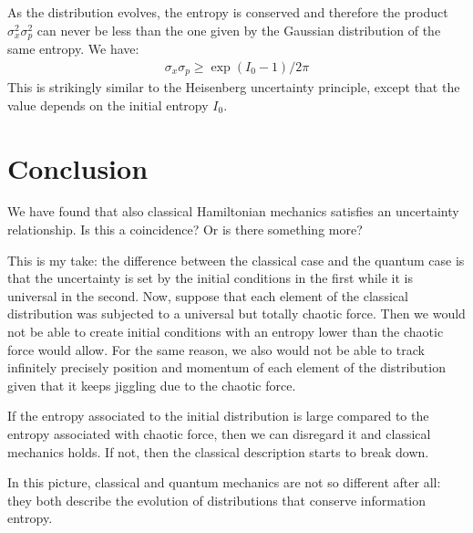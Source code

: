 \documentclass[aps,pra,10pt,floatfix,nofootinbib]{revtex4-1}
\theoremstyle{definition}
\begin{document}
As the distribution evolves, the entropy is conserved and therefore the product $\sigma_x^2 \sigma_p^2$ can never be less than the one given by the Gaussian distribution of the same entropy. We have:
\begin{align*}
\sigma_x\sigma_p \geq \exp (I_0 - 1) / 2 \pi 
\end{align*}
This is strikingly similar to the Heisenberg uncertainty principle, except that the value depends on the initial entropy $I_0$.

\section{Conclusion}

We have found that also classical Hamiltonian mechanics satisfies an uncertainty relationship. Is this a coincidence? Or is there something more?

This is my take: the difference between the classical case and the quantum case is that the uncertainty is set by the initial conditions in the first while it is universal in the second. Now, suppose that each element of the classical distribution was subjected to a universal but totally chaotic force. Then we would not be able to create initial conditions with an entropy lower than the chaotic force would allow. For the same reason, we also would not be able to track infinitely precisely position and momentum of each element of the distribution given that it keeps jiggling due to the chaotic force.

If the entropy associated to the initial distribution is large compared to the entropy associated with chaotic force, then we can disregard it and classical mechanics holds. If not, then the classical description starts to break down.

In this picture, classical and quantum mechanics are not so different after all: they both describe the evolution of distributions that conserve information entropy.
\end{document}
